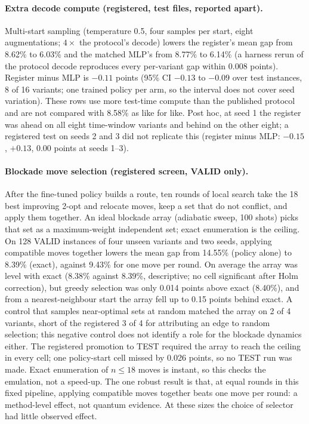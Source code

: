 \documentclass{article}
\begin{document}
\paragraph{Extra decode compute (registered, test files, reported apart).} Multi-start sampling (temperature 0.5,
four samples per start, eight augmentations; $4\times$ the protocol's decode) lowers the register's mean gap from 8.62\%
to 6.03\% and the matched MLP's from 8.77\% to 6.14\% (a harness rerun of the protocol decode reproduces every per-variant
gap within 0.008 points). Register minus MLP is $-0.11$ points (95\% CI $-0.13$ to $-0.09$ over test instances, 8 of 16
variants; one trained policy per arm, so the interval does not cover seed variation). These rows use more test-time
compute than the published protocol and are not compared with 8.58\% as like for like. Post hoc, at seed 1 the register was ahead on all eight time-window
variants and behind on the other eight; a registered test on seeds 2 and 3 did not replicate this (register minus MLP:
$-0.15$, $+0.13$, $0.00$ points at seeds 1--3).

\paragraph{Blockade move selection (registered screen, VALID only).} After the fine-tuned policy builds a route, ten
rounds of local search take the 18 best improving 2-opt and relocate moves, keep a set that do not conflict, and apply
them together. An ideal blockade array (adiabatic sweep, 100 shots) picks that set as a maximum-weight independent set;
exact enumeration is the ceiling. On 128 VALID instances of four unseen variants and two seeds, applying compatible
moves together lowers the mean gap from 14.55\% (policy alone) to 8.39\% (exact), against 9.43\% for one move per round.
On average the array was level with exact (8.38\% against 8.39\%, descriptive; no cell significant after Holm
correction), but greedy selection was only 0.014 points above exact (8.40\%), and from a nearest-neighbour start the
array fell up to 0.15 points behind exact. A control that samples near-optimal sets at random matched the array on 2 of
4 variants, short of the registered 3 of 4 for attributing an edge to random selection; this negative control does not
identify a role for the blockade dynamics either. The registered promotion to TEST
required the array to reach the ceiling in every cell; one policy-start cell missed by 0.026 points, so no TEST run was
made. Exact enumeration of $n\le 18$ moves is instant, so this checks the emulation, not a speed-up. The one robust
result is that, at equal rounds in this fixed pipeline, applying compatible moves together beats one move per round: a
method-level effect, not quantum evidence. At these sizes the choice of selector had little observed effect.
\end{document}
